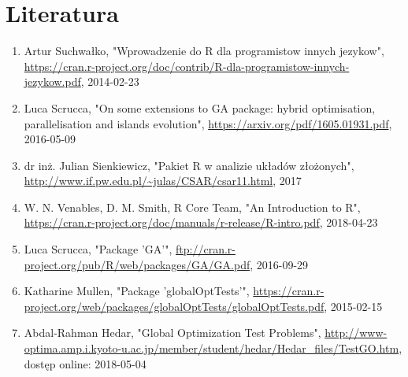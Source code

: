 \documentclass{article}
\begin{document}
\section{Literatura}
\begin{enumerate}
\item Artur Suchwałko, "Wprowadzenie do R dla programistow innych jezykow", \url{https://cran.r-project.org/doc/contrib/R-dla-programistow-innych-jezykow.pdf}, 2014-02-23
\item Luca Scrucca, "On some extensions to GA package:
hybrid optimisation, parallelisation and islands evolution", \url{https://arxiv.org/pdf/1605.01931.pdf}, 2016-05-09
\item dr inż. Julian Sienkiewicz, "Pakiet R w analizie układów złożonych", \url{http://www.if.pw.edu.pl/~julas/CSAR/csar11.html}, 2017
\item W. N. Venables, D. M. Smith, R Core Team, "An Introduction to R", \url{https://cran.r-project.org/doc/manuals/r-release/R-intro.pdf}, 2018-04-23
\item Luca Scrucca, "Package 'GA'", \url{ftp://cran.r-project.org/pub/R/web/packages/GA/GA.pdf}, 2016-09-29
\item Katharine Mullen, "Package 'globalOptTests'", \url{https://cran.r-project.org/web/packages/globalOptTests/globalOptTests.pdf},
2015-02-15
\item Abdal-Rahman Hedar, "Global Optimization Test Problems", \url{http://www-optima.amp.i.kyoto-u.ac.jp/member/student/hedar/Hedar_files/TestGO.htm}, dostęp online: 2018-05-04
\end{enumerate}
\end{document}
